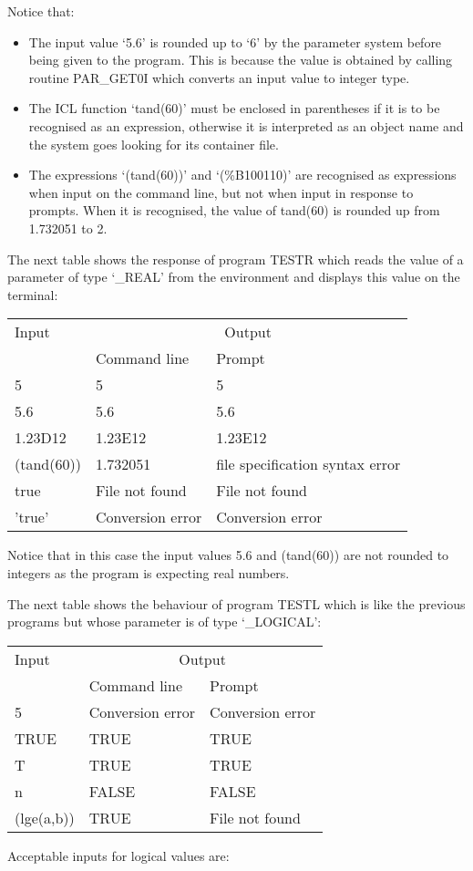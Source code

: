 Notice that:
\begin{itemize}
\item The input value `5.6' is rounded up to `6' by the parameter system before
 being given to the program.
 This is because the value is obtained by calling routine PAR\_GET0I which
 converts an input value to integer type.
\item The ICL function `tand(60)' must be enclosed in parentheses if it is to be
 recognised as an expression, otherwise it is interpreted as an object name
 and the system goes looking for its container file.
\item The expressions `(tand(60))' and `(\%B100110)' are recognised as
 expressions when input on the command line, but not when input in response to
 prompts.
 When it is recognised, the value of tand(60) is rounded up from 1.732051 to 2.
\end{itemize}
The next table shows the response of program TESTR which reads the value of
a parameter of type `\_REAL' from the environment and displays this value on
the terminal:
\begin{center}
\begin{tabular}{|l|l|l|}
\hline
Input & \multicolumn{2}{c|}{Output} \\ \cline{2-3}
& Command line & Prompt \\
\hline
5 & 5 & 5 \\
5.6 & 5.6 & 5.6 \\
1.23D12 & 1.23E12 & 1.23E12 \\
(tand(60)) & 1.732051 & file specification syntax error \\
true & File not found & File not found \\
'true' & Conversion error & Conversion error \\
\hline
\end{tabular}
\end{center}
Notice that in this case the input values 5.6 and (tand(60)) are not rounded to
integers as the program is expecting real numbers.

The next table shows the behaviour of program TESTL which is like the previous
programs but whose parameter is of type `\_LOGICAL':
\begin{center}
\begin{tabular}{|l|l|l|}
\hline
Input & \multicolumn{2}{c|}{Output} \\ \cline{2-3}
& Command line & Prompt \\
\hline
5 & Conversion error & Conversion error \\
TRUE & TRUE & TRUE \\
T & TRUE & TRUE \\
n & FALSE & FALSE \\
(lge(a,b)) & TRUE & File not found \\
\hline
\end{tabular}
\end{center}
Acceptable inputs for logical values are:

